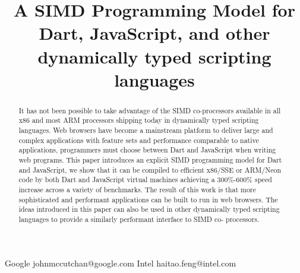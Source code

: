 \documentclass[preprint]{sigplanconf}
\begin{document}
\setlength{\pdfpageheight}{\paperheight}
\setlength{\pdfpagewidth}{\paperwidth}






\title{A SIMD Programming Model for Dart, JavaScript, and other dynamically typed scripting languages}

           {Google}
           {johnmccutchan@google.com}
           {Intel}
           {haitao.feng@intel.com}

\maketitle

\begin{abstract}

It has not been possible to take advantage of the SIMD co-processors available
in all x86 and most ARM processors shipping today in dynamically typed scripting
languages. Web browsers have become a mainstream platform to deliver large and
complex applications with feature sets and performance comparable to native
applications, programmers must choose between Dart and JavaScript when writing
web programs. This paper introduces an explicit SIMD programming model for Dart
and JavaScript, we show that it can be compiled to efficient x86/SSE or ARM/Neon
code by both Dart and JavaScript virtual machines achieving a 300\%-600\% speed
increase across a variety of benchmarks. The result of this work is that more
sophisticated and performant applications can be built to run in web browsers.
The ideas introduced in this paper can also be used in other dynamically typed
scripting languages to provide a similarly performant interface to SIMD co-
processors.

\end{abstract}
\end{document}
